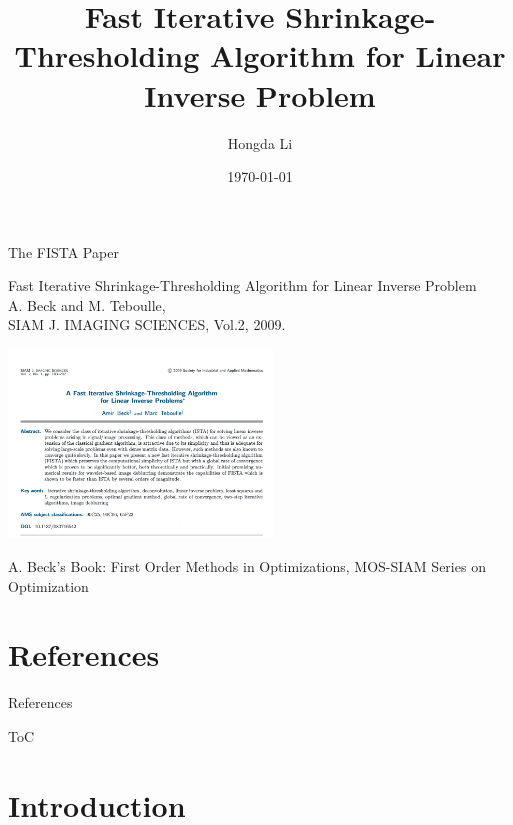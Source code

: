 \documentclass[11pt]{beamer}
\author[Hongda Li]{Hongda Li}
\title[The FISTA Paper]{Fast Iterative Shrinkage-Thresholding Algorithm for Linear Inverse Problem}
\institute[]{UBC Okanagan}
\date{\today}
\begin{document}
\begin{frame}
    \titlepage
\end{frame}
\begin{frame}{The FISTA Paper}
    \begin{center}
        Fast Iterative Shrinkage-Thresholding Algorithm for Linear Inverse Problem
        \\
        {\footnotesize
            A. Beck and M. Teboulle,
            \\ SIAM J. IMAGING SCIENCES, Vol.2, 2009. 
        }
    \end{center}
    \begin{center}
        \includegraphics[width=7cm]{screen_shot_paper.png}    
    \end{center}
    A. Beck's Book: First Order Methods in Optimizations, MOS-SIAM Series on Optimization
\end{frame}
\section{References}
    \begin{frame}{References}
        
\end{frame}
\begin{frame}{ToC}
    \tableofcontents
\end{frame}


\section{Introduction}
    
\end{document}
